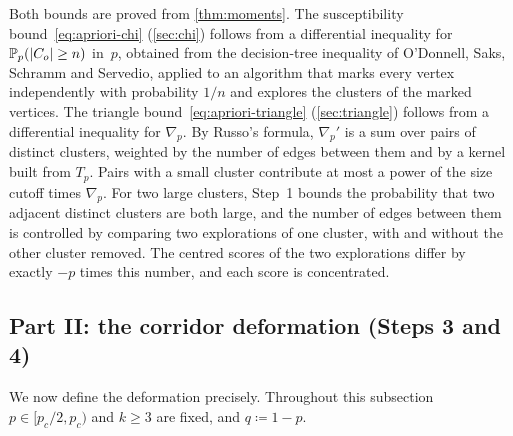 Both bounds are proved from \cref{thm:moments}. The susceptibility bound~\eqref{eq:apriori-chi}
(\cref{sec:chi}) follows from a differential inequality for $\mathbb P_p(\lvert C_o\rvert\ge n)$ in~$p$, obtained from
the decision-tree inequality of O'Donnell, Saks, Schramm and Servedio, applied to an algorithm that
marks every vertex independently with probability $1/n$ and explores the clusters of the marked
vertices. The triangle bound~\eqref{eq:apriori-triangle} (\cref{sec:triangle}) follows from a
differential inequality for $\nabla_p$. By Russo's formula, $\nabla_p'$ is a sum over pairs of distinct
clusters, weighted by the number of edges between them and by a kernel built from $T_p$. Pairs with a
small cluster contribute at most a power of the size cutoff times $\nabla_p$. For two large clusters,
Step~1 bounds the probability that two adjacent distinct clusters are both large, and the number of
edges between them is controlled by comparing two explorations of one cluster, with and without the
other cluster removed. The centred scores of the two explorations differ by exactly $-p$ times this
number, and each score is concentrated.

\subsection{Part II: the corridor deformation (Steps 3 and 4)}\label{sec:part2}

We now define the deformation precisely. Throughout this subsection $p\in[p_c/2,p_c)$ and $k\ge3$ are
fixed, and $q\coloneqq1-p$.

